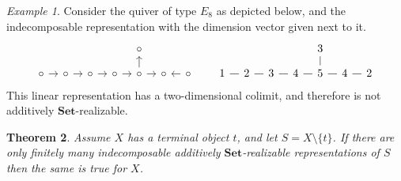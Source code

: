 \documentclass[a4paper]{amsart}
\theoremstyle{plain}
\newtheorem{theorem}{Theorem}[section]
\theoremstyle{definition}
\theoremstyle{remark}
\newtheorem{example}[theorem]{Example}
\newcommand{\Set}{\mathbf{Set}}
\begin{document}
\begin{example}
Consider the quiver of type \( E_8 \) as depicted below, and the indecomposable representation with the dimension vector given next to it.
\[ \begin{tikzcd}[sep=3mm]
&&&& \circ &&&&&&&& 3 && \\
\circ \ar[r] & \circ \ar[r] & \circ \ar[r] & \circ \ar[r] & \circ \ar[r] \ar[u] & \circ & \circ \ar[l]  && 1 \ar[r,-] & 2 \ar[r,-] & 3 \ar[r,-] & 4 \ar[r,-] & 5 \ar[r,-] \ar[u,-] & 4 & 2 \ar[l,-]
\end{tikzcd} \]
This linear representation has a two-dimensional colimit, and therefore is not additively \( \Set \)-realizable.
\end{example}

\begin{theorem} \label{thm.add_terminal}
Assume \( X \) has a terminal object \( t \), and let \( S = X \setminus \{ t \} \). If there are only finitely many indecomposable additively \( \Set \)-realizable representations of \( S \) then the same is true for \( X \).
\end{theorem}
\end{document}
